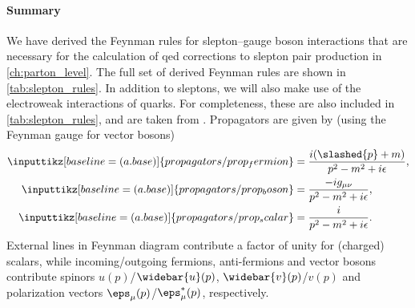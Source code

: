 \paragraph{Summary}
We have derived the Feynman rules for slepton--gauge boson interactions that are necessary for the calculation of \gls{qed} corrections to slepton pair production in \cref{ch:parton_level}. The full set of derived Feynman rules are shown in \cref{tab:slepton_rules}.
In addition to sleptons, we will also make use of the electroweak interactions of quarks.
For completeness, these are also included in \cref{tab:slepton_rules}, and are taken from \cite{Richardson:2000nt}.
Propagators are given by (using the Feynman gauge for vector bosons)~\cite{Peskin:1995ev}
\begin{equation}\label{eq:propagators_and_externals}
\begin{split}
    \inputtikz[baseline=(a.base)]{propagators/prop_fermion} &= \frac{i(\slashed{p}+m)}{p^2-m^2+i\epsilon},
    \\
    \inputtikz[baseline=(a.base)]{propagators/prop_boson} &= \frac{-ig_{\mu\nu}}{p^2-m^2+i\epsilon},
    \\
    \inputtikz[baseline=(a.base)]{propagators/prop_scalar} &= \frac{i}{p^2-m^2+i\epsilon}.
\end{split}
\end{equation}
External lines in Feynman diagram contribute a factor of unity for (charged) scalars, while incoming/outgoing fermions, anti-fermions and vector bosons contribute spinors $u(p)$/$\widebar{u}(p)$, $\widebar{v}(p)$/$v(p)$ and polarization vectors $\eps_\mu(p)$/$\eps_\mu^*(p)$, respectively.



